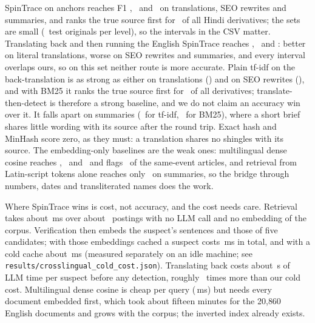 \documentclass[11pt,a4paper]{article}
\newcommand{\code}[1]{\texttt{#1}}
\begin{document}
SpinTrace on anchors reaches F1 \nXlTrans, \nXlSeo\ and \nXlSum\ on translations, SEO rewrites and summaries, and ranks the true source first for \nXlPone\ of all Hindi derivatives; the sets are small (\nXlTestN\ test originals per level), so the intervals in the CSV matter. Translating back and then running the English SpinTrace reaches \nBtSpinTrans, \nBtSpinSeo\ and \nBtSpinSum: better on literal translations, worse on SEO rewrites and summaries, and every interval overlaps ours, so on this set neither route is more accurate. Plain tf-idf on the back-translation is as strong as either on translations (\nBtTfidfTrans) and on SEO rewrites (\nBtTfidfSeo), and with BM25 it ranks the true source first for \nBtTfidfPone\ of all derivatives; translate-then-detect is therefore a strong baseline, and we do not claim an accuracy win over it. It falls apart on summaries (\nBtTfidfSum\ for tf-idf, \nBtBmSum\ for BM25), where a short brief shares little wording with its source after the round trip. Exact hash and MinHash score zero, as they must: a translation shares no shingles with its source. The embedding-only baselines are the weak ones: multilingual dense cosine reaches \nDenseTrans, \nDenseSeo\ and \nDenseSum\ and flags \nDenseFprSame\ of the same-event articles, and retrieval from Latin-script tokens alone reaches only \nLatinSum\ on summaries, so the bridge through numbers, dates and transliterated names does the work.

Where SpinTrace wins is cost, not accuracy, and the cost needs care. Retrieval takes about \nXlRetMs\,ms over about \nXlPostings\ postings with no LLM call and no embedding of the corpus. Verification then embeds the suspect's sentences and those of five candidates; with those embeddings cached a suspect costs \nXlMs\,ms in total, and with a cold cache about \nXlColdMs\,ms (measured separately on an idle machine; see \code{results/crosslingual\_cold\_cost.json}). Translating back costs about \nBtLlmSec\,s of LLM time per suspect before any detection, roughly \nSpeedup\ times more than our cold cost. Multilingual dense cosine is cheap per query (\nDenseMs\,ms) but needs every document embedded first, which took about fifteen minutes for the 20{,}860 English documents and grows with the corpus; the inverted index already exists.

\begin{table}[t]
  \centering\small
  \caption{Ablations for the Hindi path, test macro F1 over the three levels, each variant refit on dev. Full-system numbers differ from Table~\ref{tab:xl} because the ablation pools all levels.}
  \label{tab:xlabl}
  \footnotesize
  
\end{table}
\end{document}

